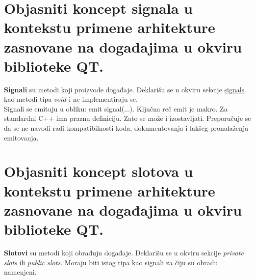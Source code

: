 \documentclass[a4paper]{article}
\begin{document}
\section{Objasniti koncept signala u kontekstu primene arhitekture
         zasnovane na dogadajima u okviru biblioteke QT.}
  \textbf{Signali} su metodi koji proizvode događaje. Deklarišu se u okviru sekcije \underline{signals}
  kao metodi tipa $void$ i ne implementiraju se. \\
  \indent Signali se emituju u obliku: emit signal(...). Ključna reč emit je makro. Za standardni C++ ima praznu 
  definiciju. Zato se može i izostavljati. Preporučuje se da se ne navodi radi kompatibilnosti koda, 
  dokumentovanja i lakšeg pronalaženja emitovanja.

\section{Objasniti koncept slotova u kontekstu primene arhitekture zasnovane na događajima u 
         okviru biblioteke QT.}
  \textbf{Slotovi} su metodi koji obrađuju događaje. Deklarišu se u okviru sekcije \textit{private slots}
  ili \textit{public slots}. Moraju biti istog tipa kao signali za čiju su obradu namenjeni.
\end{document}
